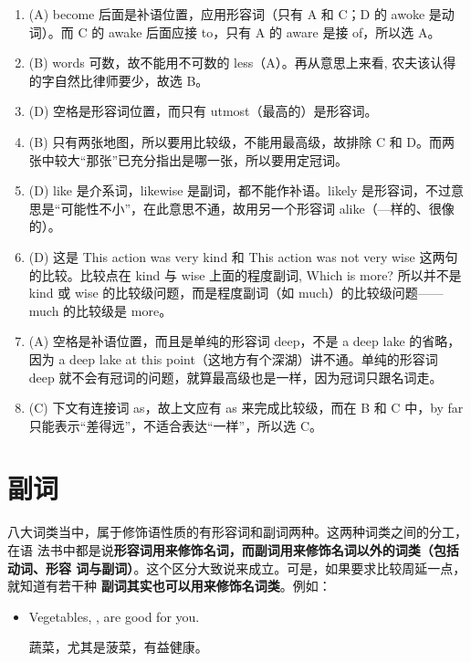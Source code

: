 \documentclass{yufa}
\newcommand\unbf[1]{\CJKunderline[thickness=0.8pt, textformat=\bfseries]{#1}}
\begin{document}
\begin{enumerate}
\item (A) become 后面是补语位置，应用形容词（只有 A 和 C；D 的 awoke 是动词）。而 C 的 awake 后面应接 to，只有 A 的 aware 是接 of，所以选 A。
\item (B) words 可数，故不能用不可数的 less（A）。再从意思上来看, 农夫该认得的字自然比律师要少，故选 B。

\item  (D) 空格是形容词位置，而只有 utmost（最高的）是形容词。

\item  (B) 只有两张地图，所以要用比较级，不能用最高级，故排除 C 和 D。而两张中较大“那张”已充分指出是哪一张，所以要用定冠词。

\item  (D) like 是介系词，likewise 是副词，都不能作补语。likely 是形容词，不过意思是“可能性不小”，在此意思不通，故用另一个形容词 alike（—样的、很像的）。

\item (D) 这是 This action was very kind 和 This action was not very wise 这两句的比较。比较点在 kind 与 wise 上面的程度副词, Which is more? 所以并不是 kind 或 wise 的比较级问题，而是程度副词（如 much）的比较级问题——much 的比较级是 more。

\item (A) 空格是补语位置，而且是单纯的形容词 deep，不是 a deep lake 的省略，因为 a deep lake at this point（这地方有个深湖）讲不通。单纯的形容词 deep 就不会有冠词的问题，就算最高级也是一样，因为冠词只跟名词走。

\item (C) 下文有连接词 as，故上文应有 as 来完成比较级，而在 B 和 C 中，by far 只能表示“差得远”，不适合表达“一样”，所以选 C。
\end{enumerate}

\chapter{副词}

八大词类当中，属于修饰语性质的有形容词和副词两种。这两种词类之间的分工，在语
法书中都是说\textbf{形容词用来修饰名词，而副词用来修饰名词以外的词类（包括动词、形容
  词与副词）}。这个区分大致说来成立。可是，如果要求比较周延一点，就知道有若干种
\textbf{副词其实也可以用来修饰名词类}。例如：

\begin{itemize}
\item  Vegetables, \unbf{especially spinach}, are good for you.

  蔬菜，尤其是菠菜，有益健康。
\end{itemize}
\end{document}
